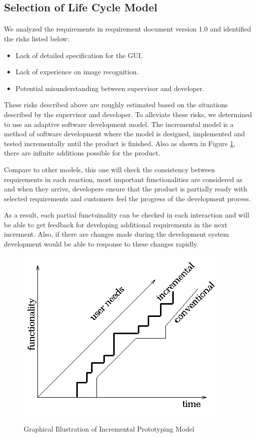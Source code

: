 \subsection{Selection of Life Cycle Model}
\paragraph{} We analyzed the requirements in requirement document version 1.0 and identified the risks listed below:
\begin{itemize}
\item Lack of detailed specification for the GUI.
\item Lack of experience on image recognition.
\item Potential misunderstanding between supervisor and developer.
\end{itemize}
\par These risks described above are roughly estimated based on the situations described by the supervisor and developer. To alleviate these risks, we determined to use an adaptive software development model. The incremental model is a method of software development where the model is designed, implemented and tested incrementally until the product is finished. Also as shown in Figure \ref{IncrmentalModel}, there are infinite additions possible for the product.
\par Compare to other models, this one will check the consistency between requirements in each reaction, most important functionalities are considered as and when they arrive, developers ensure that the product is partially ready with selected requirements and customers feel the progress of the development process.
\par As a result, each partial functuinality can be checked in each interaction and will be able to get feedback for developing additional requirements in the next increment. Also, if there are changes made during the development system development would be able to response to these changes rapidly.

\begin{figure}[htb]
\centering
\includegraphics[width=.5\textwidth]{section02/assets/IncrementalModel.png}
\caption[Short Caption 2]{\label{IncrmentalModel}Graphical Illustration of Incremental Prototyping Model}
\end{figure}

